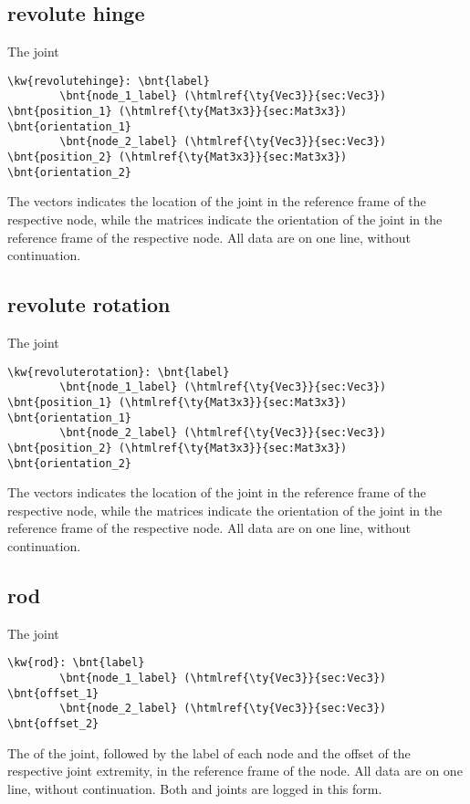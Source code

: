 \subsection{revolute hinge}
The  joint
\begin{Verbatim}[commandchars=\\\{\}]
    \kw{revolutehinge}: \bnt{label}
        \bnt{node_1_label} (\htmlref{\ty{Vec3}}{sec:Vec3}) \bnt{position_1} (\htmlref{\ty{Mat3x3}}{sec:Mat3x3}) \bnt{orientation_1}
        \bnt{node_2_label} (\htmlref{\ty{Vec3}}{sec:Vec3}) \bnt{position_2} (\htmlref{\ty{Mat3x3}}{sec:Mat3x3}) \bnt{orientation_2}
\end{Verbatim}
The  vectors indicates the location of the joint
in the reference frame of the respective node,
while the  matrices indicate the orientation of the joint
in the reference frame of the respective node.
All data are on one line, without continuation.

\subsection{revolute rotation}
The  joint
\begin{Verbatim}[commandchars=\\\{\}]
    \kw{revoluterotation}: \bnt{label}
        \bnt{node_1_label} (\htmlref{\ty{Vec3}}{sec:Vec3}) \bnt{position_1} (\htmlref{\ty{Mat3x3}}{sec:Mat3x3}) \bnt{orientation_1}
        \bnt{node_2_label} (\htmlref{\ty{Vec3}}{sec:Vec3}) \bnt{position_2} (\htmlref{\ty{Mat3x3}}{sec:Mat3x3}) \bnt{orientation_2}
\end{Verbatim}
The  vectors indicates the location of the joint
in the reference frame of the respective node,
while the  matrices indicate the orientation of the joint
in the reference frame of the respective node.
All data are on one line, without continuation.

\subsection{rod}
The  joint
\begin{Verbatim}[commandchars=\\\{\}]
    \kw{rod}: \bnt{label}
        \bnt{node_1_label} (\htmlref{\ty{Vec3}}{sec:Vec3}) \bnt{offset_1}
        \bnt{node_2_label} (\htmlref{\ty{Vec3}}{sec:Vec3}) \bnt{offset_2}
\end{Verbatim}
The  of the joint, followed by the label of each node
and the offset of the respective joint extremity,
in the reference frame of the node.
All data are on one line, without continuation.
Both  and  joints are logged
in this form.

